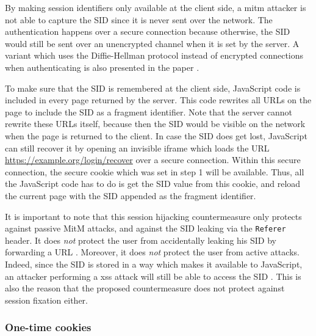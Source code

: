 By making session identifiers only available at the client side, a \gls{mitm} attacker is not able to capture the SID since it is never sent over the network. The authentication happens over a secure connection because otherwise, the SID would still be sent over an unencrypted channel when it is set by the server. A variant which uses the Diffie-Hellman protocol \cite{Diffie1976} instead of encrypted connections when authenticating is also presented in the paper \cite{Adida2008}.

To make sure that the SID is remembered at the client side, JavaScript code is included in every page returned by the server. This code rewrites all URLs on the page to include the SID as a fragment identifier. Note that the server cannot rewrite these URLs itself, because then the SID would be visible on the network when the page is returned to the client. In case the SID does get lost, JavaScript can still recover it by opening an invisible iframe which loads the URL \url{https://example.org/login/recover} over a secure connection. Within this secure connection, the secure cookie which was set in step 1 will be available. Thus, all the JavaScript code has to do is get the SID value from this cookie, and reload the current page with the SID appended as the fragment identifier.

It is important to note that this session hijacking countermeasure only protects against passive MitM attacks, and against the SID leaking via the \texttt{Referer} header. It does \emph{not} protect the user from accidentally leaking his SID by forwarding a URL \cite{Adida2008}. Moreover, it does \emph{not} protect the user from active attacks. Indeed, since the SID is stored in a way which makes it available to JavaScript, an attacker performing a \gls{xss} attack will still be able to access the SID \cite{Dacosta2011}. This is also the reason that the proposed countermeasure does not protect against session fixation either.

\subsubsection{One-time cookies}

